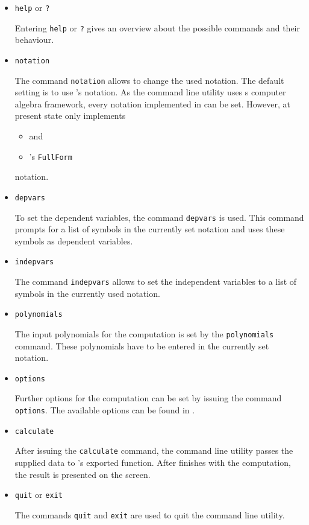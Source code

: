 \begin{itemize}
\item {\tt help} or {\tt ?}

Entering {\tt help} or {\tt ?} gives an overview about the possible commands and their behaviour.

\item{\tt notation}

The command {\tt notation} allows to change the used notation. The default setting is to use \Maple's notation. As the command line utility uses \LibExtIO{}s computer algebra framework, every notation implemented in \LibExtIO can be set. However, at present state \LibExtIO only implements
\begin{itemize}
\item \Maple and
\item \Mathematica's {\tt FullForm}
\end{itemize}
notation.

\item{\tt depvars}

To set the dependent variables, the command {\tt depvars} is used. This command prompts for a list of symbols in the currently set notation and uses these symbols as dependent variables.

\item{\tt indepvars}

The command {\tt indepvars} allows to set the independent variables to a list of symbols in the currently used notation.

\item{\tt polynomials}

The input polynomials for the computation is set by the {\tt polynomials} command. These polynomials have to be entered in the currently set notation.

\item{\tt options}

Further options for the computation can be set by issuing the command {\tt options}. The available options can be found in .

\item{\tt calculate}

After issuing the {\tt calculate} command, the command line utility passes the supplied data to \LibCharSet's exported \exportedsymbol function. After \LibCharSet finishes with the computation, the result is presented on the screen.

\item{\tt quit} or {\tt exit}

The commands {\tt quit} and {\tt exit} are used to quit the command line utility.

\end{itemize}


